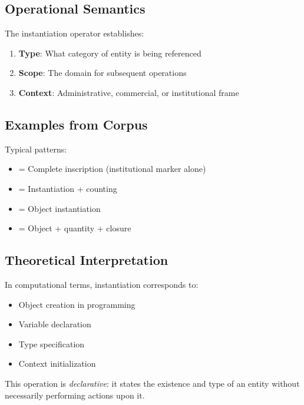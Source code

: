 \subsection{Operational Semantics}

The instantiation operator establishes:
\begin{enumerate}
    \item \textbf{Type}: What category of entity is being referenced
    \item \textbf{Scope}: The domain for subsequent operations
    \item \textbf{Context}: Administrative, commercial, or institutional frame
\end{enumerate}

\subsection{Examples from Corpus}

Typical patterns:
\begin{itemize}
    \item [FISH] = Complete inscription (institutional marker alone)
    \item [FISH][STROKES] = Instantiation + counting
    \item [JAR] = Object instantiation
    \item [JAR][STROKES][TERMINAL] = Object + quantity + closure
\end{itemize}

\subsection{Theoretical Interpretation}

In computational terms, instantiation corresponds to:
\begin{itemize}
    \item Object creation in programming
    \item Variable declaration
    \item Type specification
    \item Context initialization
\end{itemize}

This operation is \emph{declarative}: it states the existence and type of an entity without necessarily performing actions upon it.
